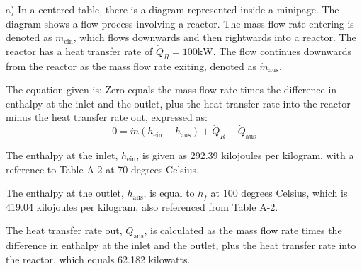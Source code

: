 a) In a centered table, there is a diagram represented inside a minipage. The diagram shows a flow process involving a reactor. The mass flow rate entering is denoted as \( \dot{m}_{\text{ein}} \), which flows downwards and then rightwards into a reactor. The reactor has a heat transfer rate of \( \dot{Q}_R = 100 \text{kW} \). The flow continues downwards from the reactor as the mass flow rate exiting, denoted as \( \dot{m}_{\text{aus}} \).

The equation given is:
Zero equals the mass flow rate times the difference in enthalpy at the inlet and the outlet, plus the heat transfer rate into the reactor minus the heat transfer rate out, expressed as:
\[ 0 = \dot{m} (h_{\text{ein}} - h_{\text{aus}}) + \dot{Q}_R - \dot{Q}_{\text{aus}} \]

The enthalpy at the inlet, \( h_{\text{ein}} \), is given as 292.39 kilojoules per kilogram, with a reference to Table A-2 at 70 degrees Celsius.

The enthalpy at the outlet, \( h_{\text{aus}} \), is equal to \( h_f \) at 100 degrees Celsius, which is 419.04 kilojoules per kilogram, also referenced from Table A-2.

The heat transfer rate out, \( \dot{Q}_{\text{aus}} \), is calculated as the mass flow rate times the difference in enthalpy at the inlet and the outlet, plus the heat transfer rate into the reactor, which equals 62.182 kilowatts.